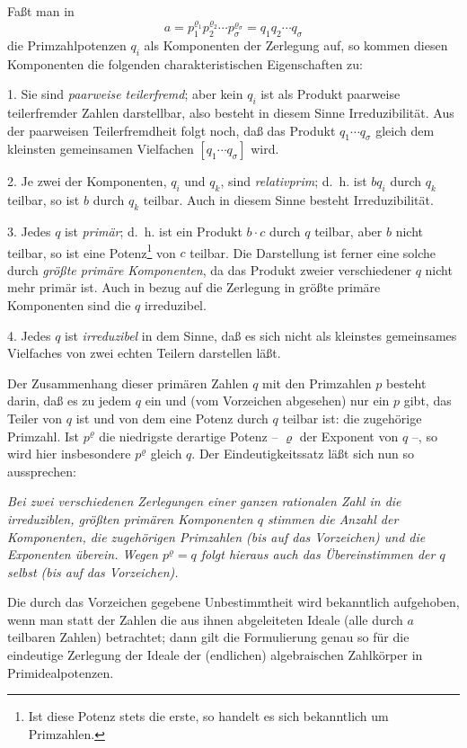 \documentclass[11pt]{article}
\begin{document}
Faßt man in
\[
 a=p_1^{\varrho_1}p_2^{\varrho_2}\cdots p_\sigma^{\varrho_\sigma}=q_1q_2\cdots q_\sigma
\]
die Primzahlpotenzen $q_i$ als Komponenten der Zerlegung auf, so kommen diesen Komponenten die folgenden charakteristischen Eigenschaften zu:

1. Sie sind \emph{paarweise teilerfremd}; aber kein $q_i$ ist als Produkt paarweise teilerfremder Zahlen darstellbar, also besteht in diesem Sinne Irreduzibilität. Aus der paarweisen Teilerfremdheit folgt noch, daß das Produkt $q_1\cdots q_\sigma$ gleich dem kleinsten gemeinsamen Vielfachen $[q_1\cdots q_\sigma]$ wird.

2. Je zwei der Komponenten, $q_i$ und $q_k$, sind \emph{relativprim}; d.~h. ist $bq_i$ durch $q_k$ teilbar, so ist $b$ durch $q_k$ teilbar. Auch in diesem Sinne besteht Irreduzibilität.

3. Jedes $q$ ist \emph{primär}; d.~h. ist ein Produkt $b\cdot c$ durch $q$ teilbar, aber $b$ nicht teilbar, so ist eine Potenz\footnote{Ist diese Potenz stets die erste, so handelt es sich bekanntlich um Primzahlen.} von $c$ teilbar. Die Darstellung ist ferner eine solche durch \emph{größte primäre Komponenten}, da das Produkt zweier verschiedener $q$ nicht mehr primär ist. Auch in bezug auf die Zerlegung in größte primäre Komponenten sind die $q$ irreduzibel.

4. Jedes $q$ ist \emph{irreduzibel} in dem Sinne, daß es sich nicht als kleinstes gemeinsames Vielfaches von zwei echten Teilern darstellen läßt.

Der Zusammenhang dieser primären Zahlen $q$ mit den Primzahlen $p$ besteht darin, daß es zu jedem $q$ ein und (vom Vorzeichen abgesehen) nur ein $p$ gibt, das Teiler von $q$ ist und von dem eine Potenz durch $q$ teilbar ist: die zugehörige Primzahl. Ist $p^\varrho$ die niedrigste derartige Potenz -- $\varrho$ der Exponent von $q$ --, so wird hier insbesondere $p^\varrho$ gleich $q$. Der Eindeutigkeitssatz läßt sich nun so aussprechen:

\emph{Bei zwei verschiedenen Zerlegungen einer ganzen rationalen Zahl in die irreduziblen, größten primären Komponenten $q$ stimmen die Anzahl der Komponenten, die zugehörigen Primzahlen (bis auf das Vorzeichen) und die Exponenten überein. Wegen $p^\varrho=q$ folgt hieraus auch das Übereinstimmen der $q$ selbst (bis auf das Vorzeichen).}

Die durch das Vorzeichen gegebene Unbestimmtheit wird bekanntlich aufgehoben, wenn man statt der Zahlen die aus ihnen abgeleiteten Ideale (alle durch $a$ teilbaren Zahlen) betrachtet; dann gilt die Formulierung genau so für die eindeutige Zerlegung der Ideale der (endlichen) algebraischen Zahlkörper in Primidealpotenzen.
\end{document}
